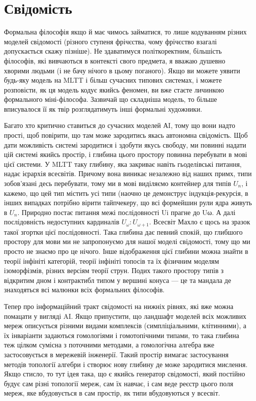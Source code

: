 \section{Свідомість}

Формальна філософія якщо й має чимось займатися, то лише кодуванням різних
моделей свідомості (різного ступеня фрічєства, чому фрічєство взагалі
допускається скажу пізніше). Не здаватимуся політкоректним, більшість
філософів, які вивчаються в контексті свого предмета, я вважаю душевно
хворими людьми (і не бачу нічого в цьому поганого). Якщо ви можете уявити
будь-яку модель на MLTT і більш сучасних типових системах, і можете розповісти,
як ця модель кодує якийсь феномен, ви вже стаєте личинкою формального
міні-філософа. Зазвичай що складніша модель, то більше вписувалося її
як твір розглядатимуть інші формальні художники.

Багато хто критично ставиться до сучасних моделей АI, тому що вони
надто прості, щоб повірити, що там може зародитись якась автономна
свідомість. Щоб дати можливість системі зародитися і здобути якусь свободу,
ми повинні надати цій системі якийсь простір, і глибина цього простору
повинна перебувати в мові цієї системи. У MLTT таку глибину, яка закриває
навіть гьоделівські питання, надає ієрархія всесвітів. Причому вона виникає
незалежно від наших примх, типи зобов'язані десь перебувати, тому ми в мові
виділяємо контейнер для типів $U_n$, і кажемо, що цей тип містить усі типи
(наочно це демонструє індукція-рекурсія, в інших випадках потрібно вірити
тайпчекеру, що всі формейшин рули ядра живуть в $U_n$. Природно постає питання
межі послідовності Ui прагне до Uω. А далі послідовність недоступних
кардиналів $U_\omega: U_{\omega+1}$. Всесвіт Махло є щось на зразок такої згортки цієї
послідовності. Така глибина дає певний спокій, що глибшого простору для
мови ми не запропонуємо для нашої моделі свідомості, тому що ми просто не
знаємо про це нічого. Інше відображення цієї глибини можна знайти в теорії
інфініті категорій, теорії інфініті топосів та їх фізичним моделям ізоморфізмів,
різних версіям теорії струн. Подих такого простору типів з відкритим дном
і контрактибл типом у вершині конуса — це та мандала де знаходяться всі
малюнки всіх формальних філософів.

Тепер про інформаційний тракт свідомості на нижніх рівнях, які вже можна
помацати у вигляді AI. Якщо припустити, що ландшафт моделей всіх можливих
мереж описується різними видами комплексів (симпліціальними, клітинними),
а їх інваріанти задаються гомологіями і гомотопічними типами, то така
глибина теж цілком сумісна з поточними методами, а гомологічна алгебра
вже застосовується в мережевій інженерії. Такий простір вимагає застосування
методів топології алгебри і створює нову глибину де може зародитися мислення.
Якщо стисло, то тут ідея така, що є якийсь генератор свідомості, який постійно
будує сам різні топології мереж, сам їх навчає, і сам веде реєстр цього поля
мереж, яке вбудовується в сам простір, як типи вбудовуються у всесвіт.

